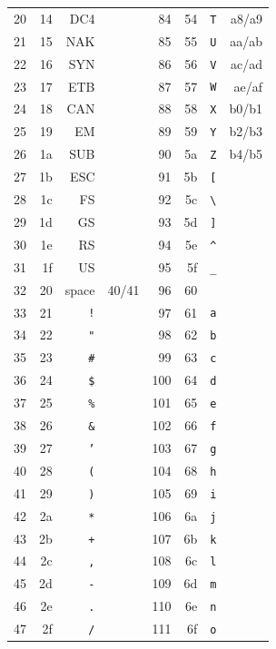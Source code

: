 {\begin{longtable}[]{@{}rrrrrrrr@{}}
20 & 14 & DC4 &  & 84 & 54 & \texttt{T} & a8/a9 \\
21 & 15 & NAK &  & 85 & 55 & \texttt{U} & aa/ab \\
22 & 16 & SYN &  & 86 & 56 & \texttt{V} & ac/ad \\
23 & 17 & ETB &  & 87 & 57 & \texttt{W} & ae/af \\
24 & 18 & CAN &  & 88 & 58 & \texttt{X} & b0/b1 \\
25 & 19 & EM &  & 89 & 59 & \texttt{Y} & b2/b3 \\
26 & 1a & SUB &  & 90 & 5a & \texttt{Z} & b4/b5 \\
27 & 1b & ESC &  & 91 & 5b & \texttt{[} &  \\
28 & 1c & FS &  & 92 & 5c & \texttt{\textbackslash{}} &  \\
29 & 1d & GS &  & 93 & 5d & \texttt{]} &  \\
30 & 1e & RS &  & 94 & 5e & \texttt{\textasciicircum{}} &  \\
31 & 1f & US &  & 95 & 5f & \texttt{\_} &  \\
32 & 20 & space & 40/41 & 96 & 60 & \texttt{\textasciigrave{}} &  \\
33 & 21 & \texttt{!} &  & 97 & 61 & \texttt{a} &  \\
34 & 22 & \texttt{"} &  & 98 & 62 & \texttt{b} &  \\
35 & 23 & \texttt{\#} &  & 99 & 63 & \texttt{c} &  \\
36 & 24 & \texttt{\$} &  & 100 & 64 & \texttt{d} &  \\
37 & 25 & \texttt{\%} &  & 101 & 65 & \texttt{e} &  \\
38 & 26 & \texttt{\&} &  & 102 & 66 & \texttt{f} &  \\
39 & 27 & \texttt{'} &  & 103 & 67 & \texttt{g} &  \\
40 & 28 & \texttt{(} &  & 104 & 68 & \texttt{h} &  \\
41 & 29 & \texttt{)} &  & 105 & 69 & \texttt{i} &  \\
42 & 2a & \texttt{*} &  & 106 & 6a & \texttt{j} &  \\
43 & 2b & \texttt{+} &  & 107 & 6b & \texttt{k} &  \\
44 & 2c & \texttt{,} &  & 108 & 6c & \texttt{l} &  \\
45 & 2d & \texttt{-} &  & 109 & 6d & \texttt{m} &  \\
46 & 2e & \texttt{.} &  & 110 & 6e & \texttt{n} &  \\
47 & 2f & \texttt{/} &  & 111 & 6f & \texttt{o} &  \\

\end{longtable}}
